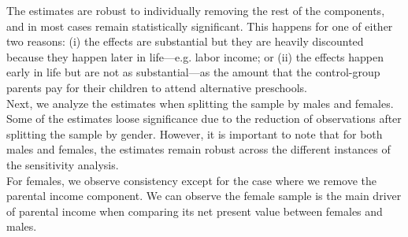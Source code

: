\noindent The estimates are robust to individually removing the rest of the components, and in most cases remain statistically significant. This happens for one of either two reasons: (i) the effects are substantial but they are heavily discounted because they happen later in life---e.g. labor income; or (ii) the effects happen early in life but are not as substantial---as the amount that the control-group parents pay for their children to attend alternative preschools.\\

\noindent Next, we analyze the estimates when splitting the sample by males and females. Some of the estimates loose significance due to the reduction of observations after splitting the sample by gender. However, it is important to note that for both males and females, the estimates remain robust across the different instances of the sensitivity analysis.\\

\noindent For females, we observe consistency except for the case where we remove the parental income component. We can observe the female sample is the main driver of parental income when comparing its net present value between females and males.

